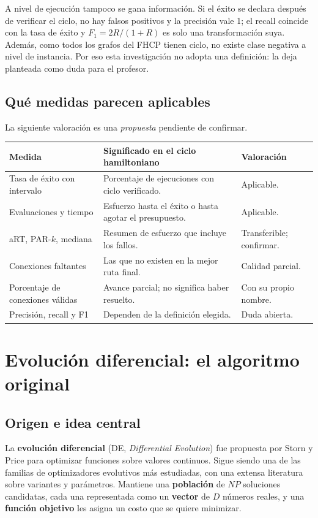 \documentclass[letterpaper,12pt]{report}
\begin{document}
A nivel de ejecución tampoco se gana información. Si el éxito se declara después de verificar el ciclo, no hay falsos positivos y la precisión vale 1; el recall coincide con la tasa de éxito y $F_1=2R/(1+R)$ es solo una transformación suya. Además, como todos los grafos del FHCP tienen ciclo, no existe clase negativa a nivel de instancia. Por eso esta investigación no adopta una definición: la deja planteada como duda para el profesor.

\subsection{Qué medidas parecen aplicables}
La siguiente valoración es una \emph{propuesta} pendiente de confirmar.

\begin{center}
\small
\begin{tabular}{@{}P{4.6cm}P{7.6cm}P{3.4cm}@{}}
\toprule
\textbf{Medida} & \textbf{Significado en el ciclo hamiltoniano} & \textbf{Valoración}\\
\midrule
Tasa de éxito con intervalo & Porcentaje de ejecuciones con ciclo verificado. & Aplicable.\\
Evaluaciones y tiempo & Esfuerzo hasta el éxito o hasta agotar el presupuesto. & Aplicable.\\
aRT, PAR-$k$, mediana & Resumen de esfuerzo que incluye los fallos. & Transferible; confirmar.\\
Conexiones faltantes & Las que no existen en la mejor ruta final. & Calidad parcial.\\
Porcentaje de conexiones válidas & Avance parcial; no significa haber resuelto. & Con su propio nombre.\\
Precisión, recall y F1 & Dependen de la definición elegida. & Duda abierta.\\
\bottomrule
\end{tabular}
\end{center}

\section{Evolución diferencial: el algoritmo original}
\subsection{Origen e idea central}
La \textbf{evolución diferencial} (DE, \emph{Differential Evolution}) fue propuesta por Storn y Price para optimizar funciones sobre valores continuos. Sigue siendo una de las familias de optimizadores evolutivos más estudiadas, con una extensa literatura sobre variantes y parámetros. Mantiene una \textbf{población} de $NP$ soluciones candidatas, cada una representada como un \textbf{vector} de $D$ números reales, y una \textbf{función objetivo} les asigna un costo que se quiere minimizar.
\end{document}
